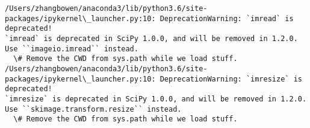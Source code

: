 \documentclass[11pt]{article}
\begin{document}
    \begin{Verbatim}[commandchars=\\\{\}]
/Users/zhangbowen/anaconda3/lib/python3.6/site-packages/ipykernel\_launcher.py:10: DeprecationWarning: `imread` is deprecated!
`imread` is deprecated in SciPy 1.0.0, and will be removed in 1.2.0.
Use ``imageio.imread`` instead.
  \# Remove the CWD from sys.path while we load stuff.
/Users/zhangbowen/anaconda3/lib/python3.6/site-packages/ipykernel\_launcher.py:10: DeprecationWarning: `imresize` is deprecated!
`imresize` is deprecated in SciPy 1.0.0, and will be removed in 1.2.0.
Use ``skimage.transform.resize`` instead.
  \# Remove the CWD from sys.path while we load stuff.

    \end{Verbatim}

    \begin{center}
    \end{center}
    { \hspace*{\fill} \\}
    
\end{document}
